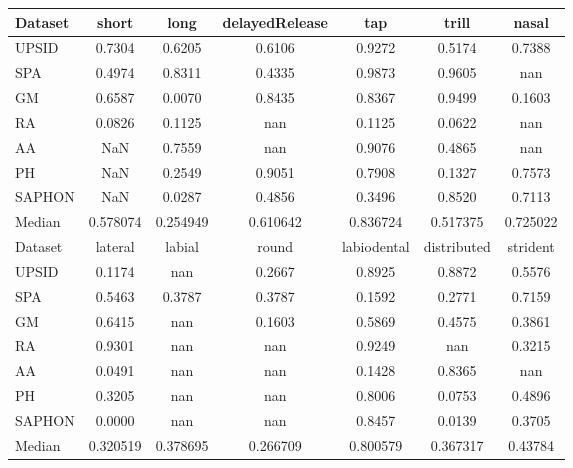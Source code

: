 \documentclass[a4paper,12pt]{article}
\begin{document}
\noindent
\begin{minipage}{\textwidth}
\begin{adjustbox}{max width=\textwidth}
\begin{tabular}{ | l | c | c | c | c | c | c |}
    \toprule
    Dataset &     short &      long & delayedRelease &       tap &     trill &     nasal \\
    \midrule
    UPSID &    0.7304 &    0.6205 &         0.6106 &    0.9272 &    0.5174 &    0.7388 \\
    SPA &    0.4974 &    0.8311 &         0.4335 &    0.9873 &    0.9605 &       nan \\
    GM &    0.6587 &    0.0070 &         0.8435 &    0.8367 &    0.9499 &    0.1603 \\
    RA &    0.0826 &    0.1125 &            nan &    0.1125 &    0.0622 &       nan \\
    AA &       NaN &    0.7559 &            nan &    0.9076 &    0.4865 &       nan \\
    PH &       NaN &    0.2549 &         0.9051 &    0.7908 &    0.1327 &    0.7573 \\
    SAPHON &       NaN &    0.0287 &         0.4856 &    0.3496 &    0.8520 &    0.7113 \\
    Median &  0.578074 &  0.254949 &       0.610642 &  0.836724 &  0.517375 &  0.725022 \\
    \bottomrule
    \toprule
    Dataset &   lateral &    labial &     round & labiodental & distributed & strident \\
    \midrule
    UPSID &    0.1174 &       nan &    0.2667 &      0.8925 &      0.8872 &   0.5576 \\
    SPA &    0.5463 &    0.3787 &    0.3787 &      0.1592 &      0.2771 &   0.7159 \\
    GM &    0.6415 &       nan &    0.1603 &      0.5869 &      0.4575 &   0.3861 \\
    RA &    0.9301 &       nan &       nan &      0.9249 &         nan &   0.3215 \\
    AA &    0.0491 &       nan &       nan &      0.1428 &      0.8365 &      nan \\
    PH &    0.3205 &       nan &       nan &      0.8006 &      0.0753 &   0.4896 \\
    SAPHON &    0.0000 &       nan &       nan &      0.8457 &      0.0139 &   0.3705 \\
    Median &  0.320519 &  0.378695 &  0.266709 &    0.800579 &    0.367317 &  0.43784 \\

\end{tabular}
\end{adjustbox}
\end{minipage}
\end{document}
